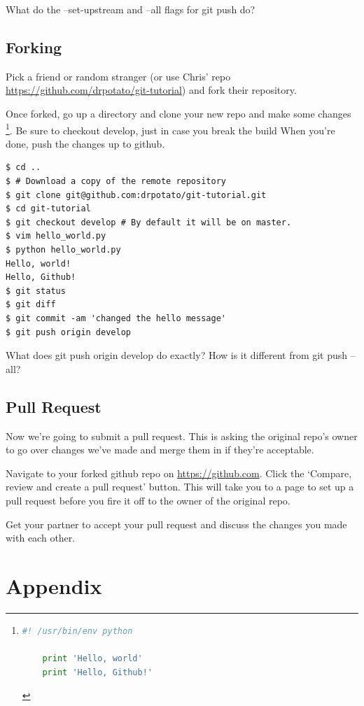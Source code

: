 \documentclass{tufte-handout}
\begin{document}
\noindent What do the --set-upstream and --all flags for git push do?

\subsection{Forking}
\noindent Pick a friend or random stranger (or use Chris' repo 
\url{https://github.com/drpotato/git-tutorial}) and fork their repository.

\noindent Once forked, go up a directory and clone your new repo and make some changes \cprotect\footnote{
	\begin{lstlisting}[language=Python]
	#! /usr/bin/env python

	print 'Hello, world'
	print 'Hello, Github!'
	\end{lstlisting}
}.
Be sure to checkout develop, just in case you break the build When you're done, push the changes up to github.

\begin{lstlisting}
$ cd ..
$ # Download a copy of the remote repository
$ git clone git@github.com:drpotato/git-tutorial.git
$ cd git-tutorial
$ git checkout develop # By default it will be on master.
$ vim hello_world.py
$ python hello_world.py
Hello, world!
Hello, Github!
$ git status
$ git diff
$ git commit -am 'changed the hello message'
$ git push origin develop
\end{lstlisting}

\noindent What does git push origin develop do exactly? How is it different from git push --all?

\subsection{Pull Request}

\noindent Now we're going to submit a pull request. This is asking the original repo's owner to go over changes we've made and merge them in if they're acceptable.

\noindent Navigate to your forked github repo on \url{https://github.com}. Click the `Compare, review and create a pull request' button. This will take you to a page to set up a pull request before you fire it off to the owner of the original repo.

\noindent Get your partner to accept your pull request and discuss the changes you made with each other.

\pagebreak
\appendix
\section{Appendix}
\end{document}

